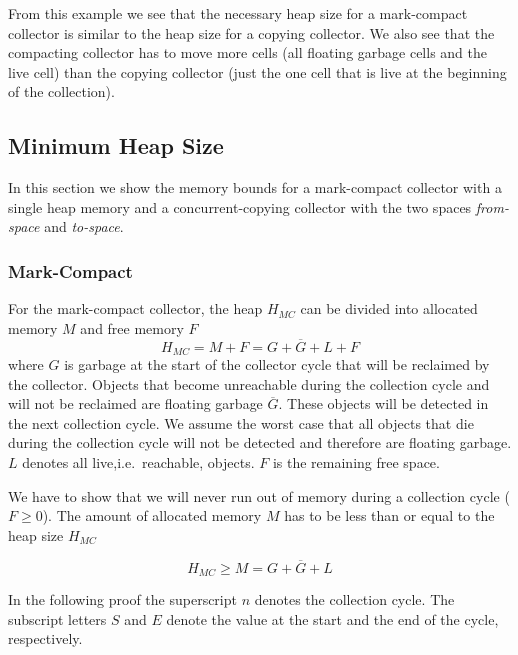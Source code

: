 From this example we see that the necessary heap size for a
mark-compact collector is similar to the heap size for a copying
collector. We also see that the compacting collector has to move
more cells (all floating garbage cells and the live cell) than the
copying collector (just the one cell that is live at the beginning
of the collection).


\subsection{Minimum Heap Size} \label{sec:min:heap}

In this section we show the memory bounds for a mark-compact
collector with a single heap memory and a concurrent-copying
collector with the two spaces \emph{from-space} and \emph{to-space}.

\subsubsection{Mark-Compact} \label{sec:gcsched:mc}

For the mark-compact collector, the heap $H_{MC}$ can be divided into
allocated memory $M$ and free memory $F$
%
\begin{equation}\label{equ:mcheap}
    H_{MC} = M + F = G + \overline{G} + L + F
\end{equation}
%
where $G$ is garbage at the start of the collector cycle that will
be reclaimed by the collector. Objects that become unreachable
during the collection cycle and will not be reclaimed are floating
garbage $\overline{G}$. These objects will be detected in the next
collection cycle. We assume the worst case that all objects that die
during the collection cycle will not be detected and therefore are
floating garbage. $L$ denotes all live,i.e.\  reachable, objects.
$F$ is the remaining free space.

We have to show that we will never run out of memory during a
collection cycle ($F\ge0$). The amount of allocated memory $M$ has to
be less than or equal to the heap size $H_{MC}$

\begin{equation}\label{equ:mcheapmin}
    H_{MC} \ge M = G + \overline{G} + L
\end{equation}


In the following proof the superscript $n$ denotes the collection
cycle. The subscript letters $S$ and $E$ denote the value at the
start and the end of the cycle, respectively.

